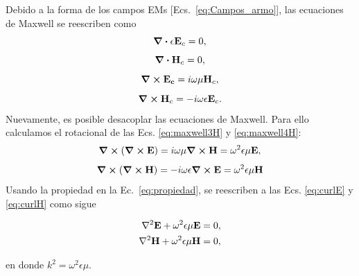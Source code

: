 Debido a la forma de los campos EMs [Ecs.~\eqref{eq:Campos_armo}], las ecuaciones de Maxwell se reescriben como~\cite{Bohren}
\begin{equation}
\div \epsilon \vb{E}_{c} = 0, 
\label{eq:maxwell1H}
\end{equation}
\begin{equation}
\div \vb{H}_{c} = 0, 
\label{eq:maxwell2H}
\end{equation}
\begin{equation}
\curl \vb{E_{c}} = i \omega \mu \vb{H}_{c}, 
\label{eq:maxwell3H}
\end{equation}
\begin{equation}
\curl \vb{H}_{c} = -i\omega \epsilon \vb{E}_{c}.
\label{eq:maxwell4H}
\end{equation}
Nuevamente, es posible desacoplar las ecuaciones de Maxwell. Para ello calculamos el rotacional de las Ecs. \eqref{eq:maxwell3H} y \eqref{eq:maxwell4H}:
\begin{equation}
\curl (\curl \vb{E})=i\omega \mu \curl \vb{H} = \omega ^{2} \epsilon \mu \vb{E},
\label{eq:curlE}
\end{equation}
\begin{equation}
\curl (\curl \vb{H})=-i\omega \epsilon \curl \vb{E} = \omega ^{2} \epsilon \mu \vb{H}
\label{eq:curlH}
\end{equation}
Usando la propiedad en la Ec.~\eqref{eq:propiedad}, se reescriben a las Ecs. \eqref{eq:curlE} y \eqref{eq:curlH} como sigue

\begin{tcolorbox}[title = Ecuación vectorial de Helmholtz]\vspace*{-0.3cm}
\begin{subequations}
	\begin{align}
\laplacian \vb{E} + \omega^{2} \epsilon \mu \vb{E}&=0, \label{eq:HelmholtzE}\\
\laplacian \vb{H} + \omega^{2} \epsilon \mu \vb{H}&=0,\label{eq:HelmholtzH}
	\end{align}
\end{subequations}
\end{tcolorbox}
\noindent en donde $k^{2}=\omega^{2} \epsilon \mu$.


